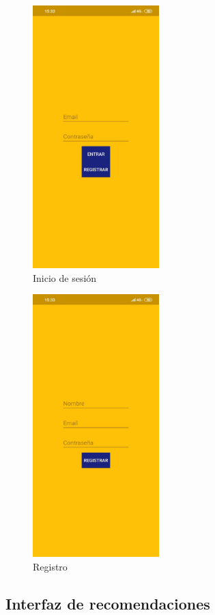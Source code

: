 \begin{figure}[H]
    \centering
    \includegraphics[height=4in]{figures/login.jpg}
    \caption{Inicio de sesión}
\end{figure}
\begin{figure}[H]
    \centering
    \includegraphics[height=4in]{figures/register.jpg}
    \caption{Registro}
\end{figure}

\subsection{Interfaz de recomendaciones}
\label{makereference3.4.7}

